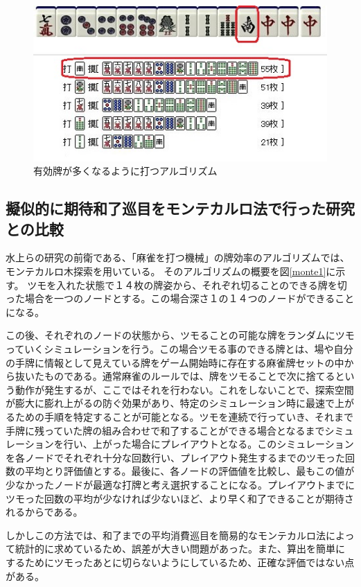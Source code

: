 \begin{figure}[H]
 \centering
 \includegraphics[keepaspectratio, scale=1,bb=0 0 320 239]
      {img/yuko.jpg}
 \caption{有効牌が多くなるように打つアルゴリズム}
 \label{yuko}
\end{figure}


\subsection{擬似的に期待和了巡目をモンテカルロ法で行った研究との比較}

水上ら\cite{bakuuti2013}の研究の前衛である、「麻雀を打つ機械」\cite{nmizu}の牌効率のアルゴリズムでは、モンテカルロ木探索を用いている。
そのアルゴリズムの概要を図\ref{monte1}に示す。
ツモを入れた状態で１４枚の牌姿から、それぞれ切ることのできる牌を切った場合を一つのノードとする。この場合深さ１の１４つのノードができることになる。


この後、それぞれのノードの状態から、ツモることの可能な牌をランダムにツモっていくシミュレーションを行う。この場合ツモる事のできる牌とは、場や自分の手牌に情報として見えている牌をゲーム開始時に存在する麻雀牌セットの中から抜いたものである。通常麻雀のルールでは、牌をツモることで次に捨てるという動作が発生するが、ここではそれを行わない。これをしないことで、探索空間が膨大に膨れ上がるの防ぐ効果があり、特定のシミュレーション時に最速で上がるための手順を特定することが可能となる。ツモを連続で行っていき、それまで手牌に残っていた牌の組み合わせで和了することができる場合となるまでシミュレーションを行い、上がった場合にプレイアウトとなる。このシミュレーションを各ノードでそれぞれ十分な回数行い、プレイアウト発生するまでのツモった回数の平均とり評価値とする。最後に、各ノードの評価値を比較し、最もこの値が少なかったノードが最適な打牌と考え選択することになる。プレイアウトまでにツモった回数の平均が少なければ少ないほど、より早く和了できることが期待されるからである。

しかしこの方法では、和了までの平均消費巡目を簡易的なモンテカルロ法によって統計的に求めているため、誤差が大きい問題があった。また、算出を簡単にするためにツモったあとに切らないようにしているため、正確な評価ではない点がある。

